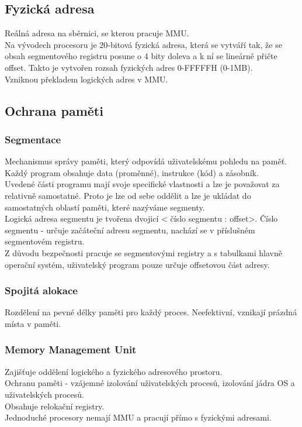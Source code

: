 \subsection{Fyzická adresa}
Reálná adresa na sběrnici, se kterou pracuje MMU.\\
Na vývodech procesoru je 20-bitová fyzická adresa, která se vytváří tak, že se obsah segmentového registru posune o 4 bity doleva a k ní se lineárně přičte offset.
Takto je vytvořen rozsah fyzických adres 0-FFFFFH (0-1MB).\\
Vzniknou překladem logických adres v MMU.\\

\subsection{Ochrana paměti}
\subsubsection*{Segmentace}
Mechanismus správy paměti, který odpovídá uživatelskému pohledu na paměť. \\
Každý program obsahuje data (proměnné), instrukce (kód) a zásobník.\\
Uvedené části programu mají svoje specifické vlastnosti a lze je považovat za relativně samostatné. Proto je lze od sebe oddělit a lze je ukládat do samostatných oblastí paměti, které nazýváme segmenty.\\
Logická adresa segmentu je tvořena dvojicí < číslo segmentu : offset>. Číslo segmentu - určuje začáteční adresu segmentu, nachází se v příslušném segmentovém registru.\\
Z důvodu bezpečnosti pracuje se segmentovými registry a s tabulkami hlavně operační systém, uživatelský program pouze určuje offsetovou část adresy.\\

\subsubsection*{Spojitá alokace}
Rozdělení na pevné délky paměti pro každý proces.
Neefektivní, vznikají prázdná místa v paměti.

\subsubsection*{Memory Management Unit}
Zajišťuje oddělení logického a fyzického  adresového prostoru.\\
Ochranu paměti - vzájemné izolování uživatelských procesů, izolování jádra OS a uživatelských procesů.\\
Obsahuje relokační registry.\\
Jednoduché procesory nemají MMU a pracují přímo s fyzickými adresami.\\


